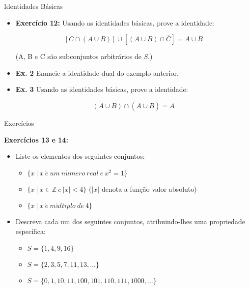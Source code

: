 \documentclass[aspectratio=169]{beamer}
\begin{document}
\begin{frame}{Identidades Básicas}
    \begin{itemize}
        \item \textbf{Exercício 12:} Usando as identidades básicas, prove a identidade:

            \[
            [C \cap (A \cup B)] \cup \left[(A \cup B) \cap \overline{C}\right] = A \cup B
            \]

            \begin{center}
                (A, B e C são subconjuntos arbitrários de $S$.)
            \end{center}
        \item \textbf{Ex. 2} Enuncie a identidade dual do exemplo anterior.

        \item \textbf{Ex. 3} Usando as identidades básicas, prove a identidade: 
        
        \[
        (A \cup B) \cap (A \cup \overline{B}) = A
        \]
    \end{itemize}
\end{frame}

\begin{frame}{Exercícios}

    \textbf{Exercícios 13 e 14:}

\begin{itemize}
    \item Liste os elementos dos seguintes conjuntos:
    \begin{itemize}
        \item $\{ x ~ | ~ x ~ \acute{e} ~ um ~ n\acute{u}mero ~ real ~ e ~ x^2 = 1 \}$
        \item $\{ x ~ | ~ x \in \mathbb{Z} ~ e ~ |x| < 4 \}$ ($|x|$ denota a função valor absoluto)
        \item $\{x ~ | ~ x ~ \acute{e} ~ m\acute{u}ltiplo ~ de ~ 4 \}$
    \end{itemize}

    \item Descreva cada um dos seguintes conjuntos, atribuindo-lhes uma propriedade específica:
    \begin{itemize}
        \item $S = \{1, 4, 9, 16\}$
        \item $S = \{2, 3, 5, 7, 11, 13, . . . \}$
        \item $S = \{0, 1, 10, 11, 100, 101, 110, 111, 1000, \dots \}$
    \end{itemize}
\end{itemize}
\end{frame}
\end{document}
